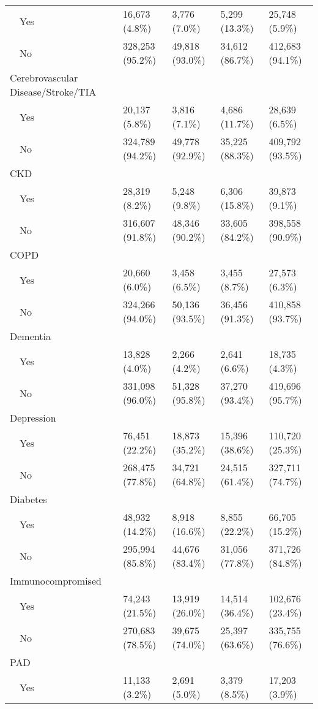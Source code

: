 \begin{longtable}{lllll}
    Yes & 16,673 (4.8\%) & 3,776 (7.0\%) & 5,299 (13.3\%) & 25,748 (5.9\%) \\ 
    No & 328,253 (95.2\%) & 49,818 (93.0\%) & 34,612 (86.7\%) & 412,683 (94.1\%) \\ 
  Cerebrovascular Disease/Stroke/TIA &  &  &  &  \\ 
    Yes & 20,137 (5.8\%) & 3,816 (7.1\%) & 4,686 (11.7\%) & 28,639 (6.5\%) \\ 
    No & 324,789 (94.2\%) & 49,778 (92.9\%) & 35,225 (88.3\%) & 409,792 (93.5\%) \\ 
  CKD &  &  &  &  \\ 
    Yes & 28,319 (8.2\%) & 5,248 (9.8\%) & 6,306 (15.8\%) & 39,873 (9.1\%) \\ 
    No & 316,607 (91.8\%) & 48,346 (90.2\%) & 33,605 (84.2\%) & 398,558 (90.9\%) \\ 
  COPD &  &  &  &  \\ 
    Yes & 20,660 (6.0\%) & 3,458 (6.5\%) & 3,455 (8.7\%) & 27,573 (6.3\%) \\ 
    No & 324,266 (94.0\%) & 50,136 (93.5\%) & 36,456 (91.3\%) & 410,858 (93.7\%) \\ 
  Dementia &  &  &  &  \\ 
    Yes & 13,828 (4.0\%) & 2,266 (4.2\%) & 2,641 (6.6\%) & 18,735 (4.3\%) \\ 
    No & 331,098 (96.0\%) & 51,328 (95.8\%) & 37,270 (93.4\%) & 419,696 (95.7\%) \\ 
  Depression &  &  &  &  \\ 
    Yes & 76,451 (22.2\%) & 18,873 (35.2\%) & 15,396 (38.6\%) & 110,720 (25.3\%) \\ 
    No & 268,475 (77.8\%) & 34,721 (64.8\%) & 24,515 (61.4\%) & 327,711 (74.7\%) \\ 
  Diabetes &  &  &  &  \\ 
    Yes & 48,932 (14.2\%) & 8,918 (16.6\%) & 8,855 (22.2\%) & 66,705 (15.2\%) \\ 
    No & 295,994 (85.8\%) & 44,676 (83.4\%) & 31,056 (77.8\%) & 371,726 (84.8\%) \\ 
  Immunocompromised &  &  &  &  \\ 
    Yes & 74,243 (21.5\%) & 13,919 (26.0\%) & 14,514 (36.4\%) & 102,676 (23.4\%) \\ 
    No & 270,683 (78.5\%) & 39,675 (74.0\%) & 25,397 (63.6\%) & 335,755 (76.6\%) \\ 
  PAD &  &  &  &  \\ 
    Yes & 11,133 (3.2\%) & 2,691 (5.0\%) & 3,379 (8.5\%) & 17,203 (3.9\%) \\ 

\end{longtable}
